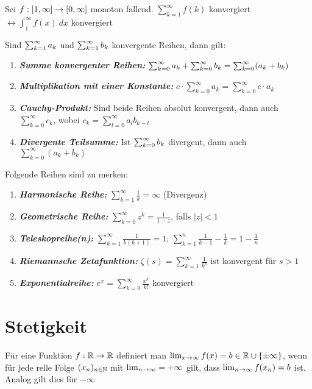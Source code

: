 \begin{satz}[Integralkriterium]
	Sei $f : [1,\infty] \rightarrow [0, \infty]$ monoton fallend. 	$\sum_{k=1}^{\infty} f(k) $ konvergiert $\leftrightarrow \int_{1}^{\infty} f(x) \medspace dx $ konvergiert
\end{satz}

\begin{satz}
	Sind $\sum_{k = 1}^{\infty} a_{k}$ und $\sum_{k = 1}^{\infty} b_{k}$ konvergente Reihen, dann gilt:
	\begin{enumerate}[noitemsep]
		\item \emph{\textbf{Summe konvergenter Reihen:}} $\sum_{k = 0}^{\infty} a_{k} + \sum_{k = 0}^{\infty} b_{k} = \sum_{k=0}^{\infty} (a_k + b_k)$
		\item \emph{\textbf{Multiplikation mit einer Konstante:}} $c \cdot \sum_{k=0}^{\infty} a_k = \sum_{k=0}^{\infty} c \cdot a_k$
		\item \emph{\textbf{Cauchy-Produkt:}} Sind beide Reihen absolut konvergent, dann auch $\sum_{k=0}^{\infty} c_k$, wobei $c_k = \sum_{l=0}^{\infty} a_lb_{k-l}$
		\item \emph{\textbf{Divergente Teilsumme:}}  Ist $\sum_{k = 0}^{\infty} b_{k}$ divergent, dann auch $\sum_{k=0}^{\infty} (a_k + b_k) $
	\end{enumerate}
\end{satz}

\begin{satz}
	Folgende Reihen sind zu merken:
	\begin{enumerate}[noitemsep]
	\item \emph{\textbf{Harmonische Reihe:}} $\sum_{k=1}^{\infty} \frac{1}{k} = \infty$ (Divergenz)
	\item \emph{\textbf{Geometrische Reihe:}} $\sum_{k=0}^{\infty} z^k = \frac{1}{1 - z}$, falls $|z| < 1$
	\item \emph{\textbf{Teleskopreihe(n):}}  $\sum_{k=1}^{\infty} \frac{1}{k(k+1)} = 1$; $\sum^n_{k=1} \frac{1}{k-1} - \frac{1}{k} = 1 - \frac{1}{n}$
	\item \emph{\textbf{Riemannsche Zetafunktion:}} $\zeta(s) = \sum_{k=1}^{\infty} \frac{1}{k^s}$ ist konvergent für $s>1$	
	\item \emph{\textbf{Exponentialreihe:}} $e^x = \sum_{k=0}^{\infty} \frac{x^k}{k!}$ konvergiert	
\end{enumerate}
\end{satz}

\section{Stetigkeit}
\begin{definition}
	Für eine Funktion $f : \mathbb{R} \rightarrow \mathbb{R}$ definiert man $\lim_{x \rightarrow \infty} f(x) = b \in \mathbb{R} \cup \{\pm \infty\}$, wenn für jede relle Folge $(x_n)_{n \in \mathbb{N}}$ mit $\lim_{n \rightarrow \infty} = + \infty$ gilt, dass $\lim_{n \rightarrow \infty} f(x_n) = b$ ist. Analog gilt dies für $- \infty$
\end{definition}

